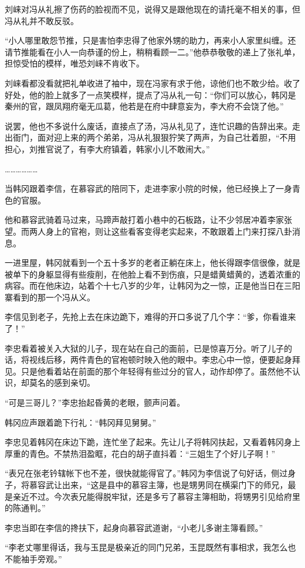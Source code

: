 刘崃对冯从礼擦了伤药的脸视而不见，说得又是跟他现在的请托毫不相关的事，但冯从礼并不敢反驳。

“小人哪里敢怨节推，只是害怕李忠得了他家外甥的助力，再来小人家里纠缠。还请节推能看在小人一向恭谨的份上，稍稍看顾一二。”他恭恭敬敬的递上了张礼单，担惊受怕的模样，唯恐刘崃不肯收下。

刘崃看都没看就把礼单收进了袖中，现在冯家有求于他，谅他们也不敢少给。收了好处，他的脸上就多了一点笑模样，提点了冯从礼一句：“你们可以放心，韩冈是秦州的官，跟凤翔府毫无瓜葛，他若是在府中肆意妄为，李大府不会饶了他。”

说罢，他也不多说什么废话，直接点了汤，冯从礼见了，连忙识趣的告辞出来。走出衙门，面对迎上来的两个弟弟，冯从礼狠狠狞笑了两声，为自己壮着胆，“不用担心，刘推官说了，有李大府镇着，韩家小儿不敢闹大。”

………………

当韩冈跟着李信，在慕容武的陪同下，走进李家小院的时候，他已经换上了一身青色的官服。

他和慕容武骑着马过来，马蹄声敲打着小巷中的石板路，让不少邻居冲着李家张望。而两人身上的官袍，则让这些看客变得老实起来，不敢跟着上门来打探八卦消息。

一进里屋，韩冈就看到一个五十多岁的老者正躺在床上，他长得跟李信很像，就是被单下的身躯显得有些瘦削，在他脸上看不到伤痕，只是蜡黄蜡黄的，透着浓重的病容。而在他床边，站着个十七八岁的少年，让韩冈为之一惊，正是他当日在三阳寨看到的那一个冯从义。

李信见到老子，先抢上去在床边跪下，难得的开口多说了几个字：“爹，你看谁来了！”

李忠看着被关入大狱的儿子，现在站在自己的面前，已是惊喜万分。听了儿子的话，将视线后移，两件青色的官袍顿时映入他的眼中。李忠心中一惊，便要起身拜见。只是他看着站在前面的那个年轻得有些过分的官人，动作却停了。虽然他不认识，却莫名的感到亲切。

“可是三哥儿？”李忠抬起昏黄的老眼，颤声问着。

韩冈应声跟着跪下行礼：“韩冈拜见舅舅。”

李忠见着韩冈在床边下跪，连忙坐了起来。先让儿子将韩冈扶起，又看着韩冈身上厚重的青色。不禁热泪盈眶，花白的胡子直抖着：“三姐生了个好儿子啊！”

“表兄在张老钤辖帐下也不差，很快就能得官了。”韩冈为李信说了句好话，侧过身子，将慕容武让出来，“这是县中的慕容主簿，也是甥男同在横渠门下的师兄，最是亲近不过。今次表兄能得脱牢狱，还是多亏了慕容主簿相助，将甥男引见给府里的陈通判。”

李忠当即在李信的搀扶下，起身向慕容武道谢，“小老儿多谢主簿看顾。”

“李老丈哪里得话，我与玉昆是极亲近的同门兄弟，玉昆既然有事相求，我怎么也不能袖手旁观。”

